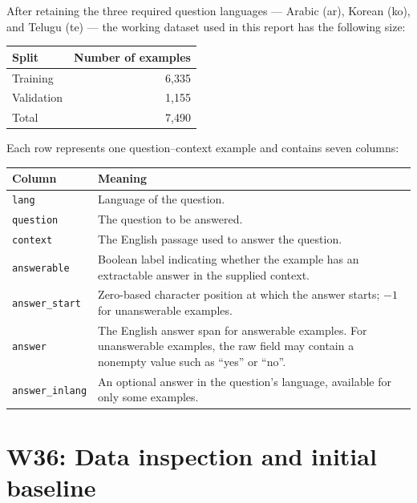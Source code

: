 \documentclass[11pt,a4paper]{article}
\begin{document}
After retaining the three required question languages
--- Arabic (ar), Korean (ko), and Telugu (te) ---
the working dataset used in this report has the following size:

\begin{center}
\begin{tabular}{lr}
\toprule
Split & Number of examples \\
\midrule
Training & 6,335 \\
Validation & 1,155 \\
\midrule
Total & 7,490 \\
\bottomrule
\end{tabular}
\end{center}

Each row represents one question--context example and contains
seven columns:

\begin{center}
\begin{tabularx}{\linewidth}{lX}
\toprule
Column & Meaning \\
\midrule
\texttt{lang}
& Language of the question. \\

\texttt{question}
& The question to be answered. \\

\texttt{context}
& The English passage used to answer the question. \\

\texttt{answerable}
& Boolean label indicating whether the example has an
extractable answer in the supplied context. \\

\texttt{answer\_start}
& Zero-based character position at which the answer starts;
$-1$ for unanswerable examples. \\

\texttt{answer}
& The English answer span for answerable examples.
For unanswerable examples, the raw field may contain
a nonempty value such as ``yes'' or ``no''. \\

\texttt{answer\_inlang}
& An optional answer in the question's language,
available for only some examples. \\
\bottomrule
\end{tabularx}
\end{center}

\section{W36: Data inspection and initial baseline}
\end{document}
